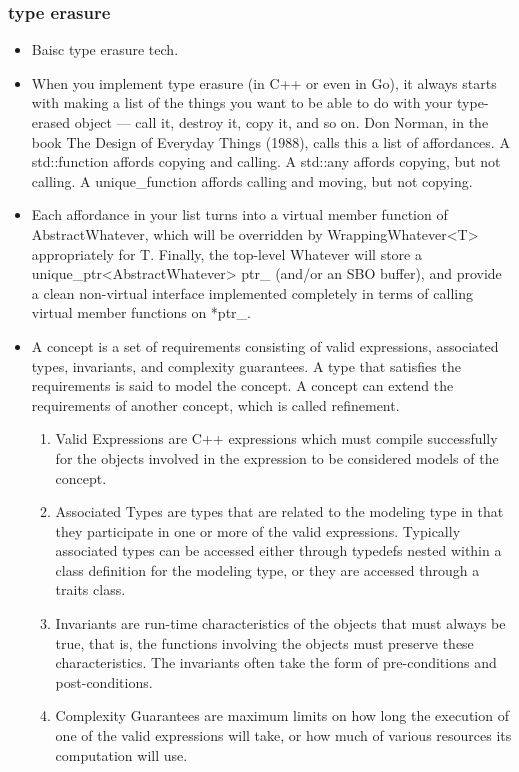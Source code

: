 \documentclass[a4paper,12pt,twoside]{book}
\begin{document}
\subsubsection{type erasure}
\begin{itemize}
\item Baisc type erasure tech.
\item When you implement type erasure (in C++ or even in Go), it always starts with making a list of the things you want to be able to do with your type-erased object — call it, destroy it, copy it, and so on. Don Norman, in the book The Design of Everyday Things (1988), calls this a list of affordances. A std::function affords copying and calling. A std::any affords copying, but not calling. A unique\_function affords calling and moving, but not copying.

\item Each affordance in your list turns into a virtual member function of AbstractWhatever, which will be overridden by WrappingWhatever<T> appropriately for T. Finally, the top-level Whatever will store a unique\_ptr<AbstractWhatever> ptr\_ (and/or an SBO buffer), and provide a clean non-virtual interface implemented completely in terms of calling virtual member functions on *ptr\_.

\item A concept is a set of requirements consisting of valid expressions, associated types, invariants, and complexity guarantees. A type that satisfies the requirements is said to model the concept. A concept can extend the requirements of another concept, which is called refinement.
\begin{enumerate}
	\item Valid Expressions are C++ expressions which must compile successfully for the objects involved in the expression to be considered models of the concept.


\item Associated Types are types that are related to the modeling type in that they participate in one or more of the valid expressions. Typically associated types can be accessed either through typedefs nested within a class definition for the modeling type, or they are accessed through a traits class.

\item Invariants are run-time characteristics of the objects that must always be true, that is, the functions involving the objects must preserve these characteristics. The invariants often take the form of pre-conditions and post-conditions.
\item Complexity Guarantees are maximum limits on how long the execution of one of the valid expressions will take, or how much of various resources its computation will use.
\end{enumerate}
\end{itemize}
\end{document}
